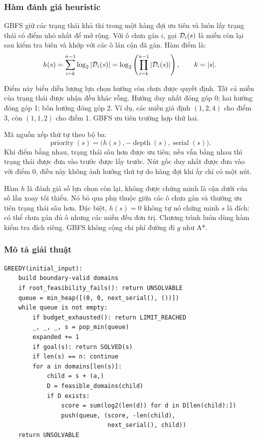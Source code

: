 \subsubsection{Hàm đánh giá heuristic}

GBFS giữ các trạng thái khả thi trong một hàng đợi ưu tiên và luôn lấy trạng
thái có điểm nhỏ nhất để mở rộng. Với ô chưa gán $i$, gọi $\mathcal{D}_i(s)$ là miền
còn lại sau kiểm tra biên và khớp với các ô lân cận đã gán. Hàm điểm là:
\begin{equation}
h(s)=\sum_{i=k}^{n-1}\log_2|\mathcal{D}_i(s)|
    =\log_2\left(\prod_{i=k}^{n-1}|\mathcal{D}_i(s)|\right),\qquad k=|s|.
\label{eq:heuristic}
\end{equation}

Điểm này biểu diễn lượng lựa chọn hướng còn chưa được quyết định. Tất cả miền
của trạng thái được nhận đều khác rỗng. Hướng duy nhất đóng góp 0; hai hướng
đóng góp 1; bốn hướng đóng góp 2. Ví dụ, các miền giả định $(1,2,4)$ cho điểm
3, còn $(1,1,2)$ cho điểm 1. GBFS ưu tiên trường hợp thứ hai.

Mã nguồn xếp thứ tự theo bộ ba:
\begin{equation}
\operatorname{priority}(s)=\big(h(s),-\operatorname{depth}(s),\operatorname{serial}(s)\big).
\end{equation}
Khi điểm bằng nhau, trạng thái sâu hơn được ưu tiên; nếu vẫn bằng nhau thì
trạng thái được đưa vào trước được lấy trước. Nút gốc duy nhất được đưa vào
với điểm 0, điều này không ảnh hưởng thứ tự do hàng đợi khi ấy chỉ có một nút.

Hàm $h$ là đánh giá số lựa chọn còn lại, không được chứng minh là cận dưới
của số lần xoay tối thiểu. Nó bỏ qua phụ thuộc giữa các ô chưa gán và thường
ưu tiên trạng thái sâu hơn. Đặc biệt, $h(s)=0$ không tự nó chứng minh $s$ là
đích: có thể chưa gán đủ ô nhưng các miền đều đơn trị. Chương trình luôn dùng
hàm kiểm tra đích riêng. GBFS không cộng chi phí đường đi $g$ như A*.

\subsubsection{Mô tả giải thuật}
\begin{lstlisting}[caption={GBFS dùng điểm miền hướng còn lại.}]
GREEDY(initial_input):
    build boundary-valid domains
    if root_feasibility_fails(): return UNSOLVABLE
    queue = min_heap([(0, 0, next_serial(), ())])
    while queue is not empty:
        if budget_exhausted(): return LIMIT_REACHED
        _, _, _, s = pop_min(queue)
        expanded += 1
        if goal(s): return SOLVED(s)
        if len(s) == n: continue
        for a in domains[len(s)]:
            child = s + (a,)
            D = feasible_domains(child)
            if D exists:
                score = sum(log2(len(d)) for d in D[len(child):])
                push(queue, (score, -len(child),
                             next_serial(), child))
    return UNSOLVABLE
\end{lstlisting}

